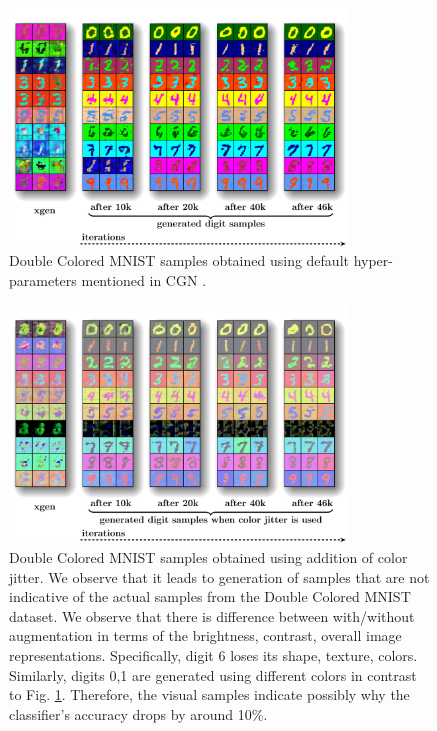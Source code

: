 \begin{figure}[ht!]
\centering
    \includegraphics[width=0.8\textwidth,height=0.5\textwidth]{../openreview/images/x_gen_original.pdf}
    \caption{Double Colored MNIST samples obtained using default hyper-parameters mentioned in CGN \cite{sauer2021counterfactual}.
    }
    \label{fig:original_grid}
\end{figure}

\begin{figure}[ht!]
\centering 
    \includegraphics[width=0.8\textwidth,height=0.5\textwidth]{images/x_gen_data_augment.pdf}
    \caption{Double Colored MNIST samples obtained using addition of color jitter. We observe that it leads to generation of samples that are not indicative of the actual samples from the Double Colored MNIST dataset.  We observe that there is difference between with/without augmentation in terms of the brightness, contrast, overall image representations. Specifically, digit 6 loses its shape, texture, colors. Similarly, digits 0,1 are generated using different colors in contrast to Fig. \ref{fig:original_grid}. Therefore, the visual samples indicate possibly why the classifier's accuracy drops by around 10\%. 
    }
    \label{fig:data_augment_grid}
\end{figure}



